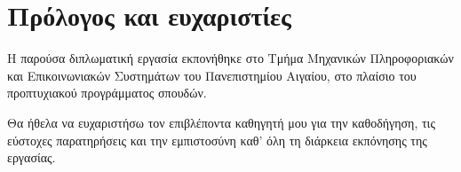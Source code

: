 \chapter*{Πρόλογος και ευχαριστίες}


Η παρούσα διπλωματική εργασία εκπονήθηκε στο Τμήμα Μηχανικών Πληροφοριακών
και Επικοινωνιακών Συστημάτων του Πανεπιστημίου Αιγαίου, στο πλαίσιο του
προπτυχιακού προγράμματος σπουδών.

Θα ήθελα να ευχαριστήσω τον επιβλέποντα καθηγητή μου για την καθοδήγηση,
τις εύστοχες παρατηρήσεις και την εμπιστοσύνη καθ' όλη τη διάρκεια
εκπόνησης της εργασίας.
